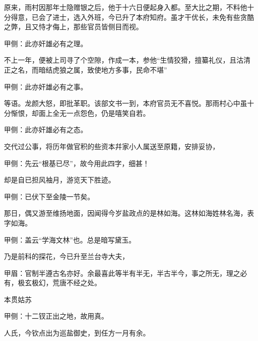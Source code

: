 \begin{parag}
    原来，雨村因那年士隐赠银之后，他于十六日便起身入都。至大比之期，不料他十分得意，已会了进士，选入外班，今已升了本府知府。虽才干优长，未免有些贪酷之弊，且又恃才侮上，那些官员皆侧目而视。\begin{note}甲侧：此亦奸雄必有之理。\end{note}不上一年，便被上司寻了个空隙，作成一本，参他“生情狡猾，擅纂礼仪，且沽清正之名，而暗结虎狼之属，致使地方多事，民命不堪”\begin{note}甲侧：此亦奸雄必有之事。\end{note}等语。龙颜大怒，即批革职。该部文书一到，本府官员无不喜悦。那雨村心中虽十分惭恨，却面上全无一点怨色，仍是嘻笑自若。\begin{note}甲侧：此亦奸雄必有之态。\end{note}交代过公事，将历年做官积的些资本幷家小人属送至原籍，安排妥协，\begin{note}甲侧：先云“根基已尽”，故今用此四字，细甚！\end{note}却是自已担风袖月，游览天下胜迹。\begin{note}甲侧：已伏下至金陵一节矣。\end{note}
\end{parag}


\begin{parag}
    那日，偶又游至维扬地面，因闻得今岁盐政点的是林如海。这林如海姓林名海，表字如海。\begin{note}甲侧：盖云“学海文林”也。总是暗写黛玉。\end{note}乃是前科的探花，今已升至兰台寺大夫，\begin{note}甲眉：官制半遵古名亦好。余最喜此等半有半无，半古半今，事之所无，理之必有，极玄极幻，荒唐不经之处。\end{note}本贯姑苏\begin{note}甲侧：十二钗正出之地，故用真。\end{note}人氏，今钦点出为巡盐御史，到任方一月有余。
\end{parag}


